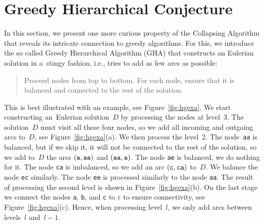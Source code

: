 \section{Greedy Hierarchical Conjecture}
\label{sec:greedy_hier}
In this section, we present one more curious property of the Collapsing Algorithm that reveals its intricate connection to greedy algorithms. For this, we introduce the so called Greedy Hierarchical Algorithm (GHA) that constructs an Eulerian solution in a~stingy fashion, i.e., tries to add as few arcs as possible:
\begin{quote}
Proceed nodes from top to bottom. For each node, ensure that it is balanced and connected to the rest of the solution.
\end{quote}
This is best illustrated with an example, see Figure~\ref{fig:hgexa}. We start constructing an~Eulerian solution~$D$ by processing the nodes at level~$3$. The solution~$D$ must visit all these four nodes, so we add all incoming and outgoing arcs to~$D$, see Figure~\ref{fig:hgexa}(a). We then process the level~2. The node~{\tt aa} is balanced, but if we skip it, it will not be connected to the rest of the solution, so we add to~$D$ the arcs $({\tt a}, {\tt aa})$ and $({\tt aa}, {\tt a})$. The node {\tt ae} is balanced, we do nothing for it. The node {\tt ca} is imbalanced, so we add an arc $({\tt c}, {\tt ca})$ to~$D$. We balance the node {\tt ec} similarly. The node {\tt ee} is processed similarly to the node {\tt aa}. The result of processing the second level is shown in Figure~\ref{fig:hgexa}(b). On the last stage we connect the nodes {\tt a}, {\tt b}, and {\tt c} to $\varepsilon$ to ensure connectivity, see Figure~\ref{fig:hgexa}(c). Hence, when processing level~$l$, we only add arcs between levels~$l$ and~$l-1$.

